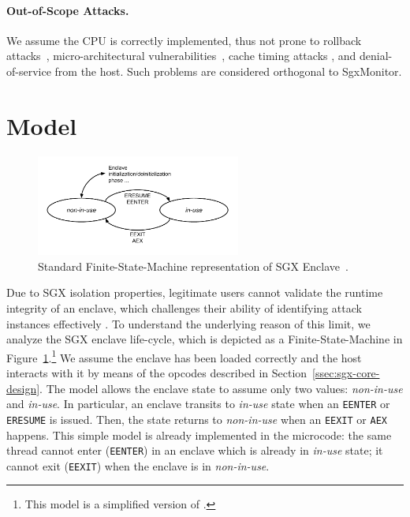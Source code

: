 \paragraph{Out-of-Scope Attacks.}
We assume the CPU is correctly implemented, thus not prone to rollback 
attacks~\citep{197191}, micro-architectural 
vulnerabilities~\citep{7163052,van2017telling,203183,203698,10.1145/3133956.3134038,kocher2019spectre,van2020lvi},
cache timing attacks 
\citep{206170,moghimi2017cachezoom,10.1145/3065913.3065915},
and denial-of-service from the host.
Such problems are considered orthogonal to SgxMonitor.

\section{Model}
\label{sec:model_sgxmonitor}

\begin{figure}[t]
	\centering
	\includegraphics[width=0.6\textwidth]{fig_c6/fmi-standard}
	\caption[Standard SGX FSM.]{Standard Finite-State-Machine representation of 
	SGX Enclave~\citep{costan2016intel}.}
	\label{fig:fmi-standard}
\end{figure}

Due to SGX isolation properties, legitimate users cannot validate the runtime 
integrity of an 
enclave, which challenges their ability of identifying attack instances
effectively \citep{snakegx,biondo2018guard,lee2017hacking}.
To understand the underlying reason of this limit, we analyze the SGX 
enclave life-cycle, which is depicted as a Finite-State-Machine in 
Figure~\ref{fig:fmi-standard}.\footnote{This model is a simplified version 
of \cite{costan2016intel}.}
We assume the enclave has been loaded correctly and the host interacts with it 
by means of the opcodes described in Section~\ref{ssec:sgx-core-design}.
The model allows the enclave state to assume only two values: 
\emph{non-in-use} and \emph{in-use}.
In particular, an enclave transits to \emph{in-use} state when an 
\texttt{EENTER} or \texttt{ERESUME} is issued.
Then, the state returns to \emph{non-in-use} when an \texttt{EEXIT} or  
\texttt{AEX} happens.
This simple model is already implemented in the microcode: the same thread 
cannot enter (\ie \texttt{EENTER}) in an enclave which is 
already in \emph{in-use} state; it cannot exit (\ie \texttt{EEXIT}) when the 
enclave is in \emph{non-in-use}.

